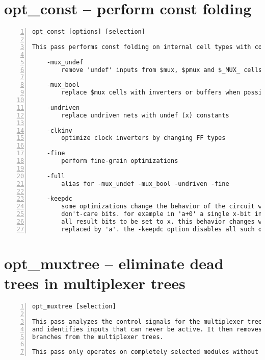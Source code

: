 \section{opt\_const -- perform const folding}
\label{cmd:opt_const}
\begin{lstlisting}[numbers=left,frame=single]
    opt_const [options] [selection]

This pass performs const folding on internal cell types with constant inputs.

    -mux_undef
        remove 'undef' inputs from $mux, $pmux and $_MUX_ cells

    -mux_bool
        replace $mux cells with inverters or buffers when possible

    -undriven
        replace undriven nets with undef (x) constants

    -clkinv
        optimize clock inverters by changing FF types

    -fine
        perform fine-grain optimizations

    -full
        alias for -mux_undef -mux_bool -undriven -fine

    -keepdc
        some optimizations change the behavior of the circuit with respect to
        don't-care bits. for example in 'a+0' a single x-bit in 'a' will cause
        all result bits to be set to x. this behavior changes when 'a+0' is
        replaced by 'a'. the -keepdc option disables all such optimizations.
\end{lstlisting}

\section{opt\_muxtree -- eliminate dead trees in multiplexer trees}
\label{cmd:opt_muxtree}
\begin{lstlisting}[numbers=left,frame=single]
    opt_muxtree [selection]

This pass analyzes the control signals for the multiplexer trees in the design
and identifies inputs that can never be active. It then removes this dead
branches from the multiplexer trees.

This pass only operates on completely selected modules without processes.
\end{lstlisting}

